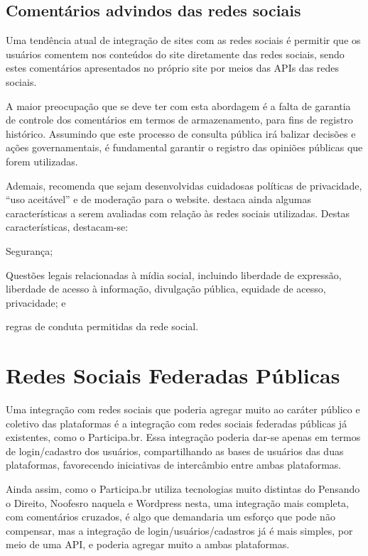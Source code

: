 \subsection{Comentários advindos das redes sociais}
Uma tendência atual de integração de sites com as redes sociais é permitir que os usuários comentem nos conteúdos do site diretamente das redes sociais, sendo estes comentários apresentados no próprio site por meios das APIs das redes sociais.

A maior preocupação que se deve ter com esta abordagem é a falta de garantia de controle dos comentários em termos de armazenamento, para fins de registro histórico. Assumindo que este processo de consulta pública irá balizar decisões e ações governamentais, é fundamental garantir o registro das opiniões públicas que forem utilizadas.

Ademais,  recomenda que sejam desenvolvidas cuidadosas políticas de privacidade, ``uso aceitável'' e de moderação para o website.  destaca ainda algumas características a serem avaliadas com relação às redes sociais utilizadas. Destas características, destacam-se:
\begin{inparaenum}
\item Segurança;
\item Questões legais relacionadas à mídia social, incluindo liberdade de expressão, liberdade de acesso à informação, divulgação pública, equidade de acesso, privacidade; e
\item regras de conduta permitidas da rede social.
\end{inparaenum}

\section{Redes Sociais Federadas Públicas}
Uma integração com redes sociais que poderia agregar muito ao caráter público e coletivo das plataformas é a integração com redes sociais federadas públicas já existentes, como o Participa.br. Essa integração poderia dar-se apenas em termos de login/cadastro dos usuários, compartilhando as bases de usuários das duas plataformas, favorecendo iniciativas de intercâmbio entre ambas plataformas.

Ainda assim, como o Participa.br utiliza tecnologias muito distintas do Pensando o Direito, Noofesro naquela e Wordpress nesta, uma integração mais completa, com comentários cruzados, é algo que demandaria um esforço que pode não compensar, mas a integração de login/usuários/cadastros já é mais simples, por meio de uma API, e poderia agregar muito a ambas plataformas.

